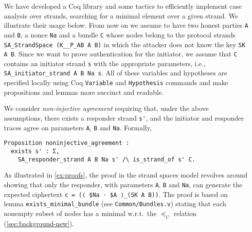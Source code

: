 We have developed a Coq library and some tactics to efficiently implement case analysis over strands, searching for a minimal element over a given strand.
We illustrate their usage below.
From now on we assume to have two honest parties \lstinline|A| and \lstinline|B|, a nonce \lstinline|Na| and a bundle \lstinline|C| whose nodes belong to the protocol strands \lstinline|SA_StrandSpace (K__P_AB A B)| in which the attacker does not know the key \lstinline|SK A B|. Since we want to prove authentication for the initiator, we assume that \lstinline|C| contains an initiator strand \lstinline|s| with the appropriate parameters, i.e., \lstinline|SA_initiator_strand A B Na s|.
All of these variables and hypotheses are specified locally using Coq \lstinline|Variable| and \lstinline|Hypothesis| commands and make propositions and lemmas more succinct and readable.

We consider \emph{non-injective agreement} requiring that, under the above assumptions,
there exists a responder strand \lstinline{s'}, and the initiator and responder traces agree on parameters
\lstinline{A}, \lstinline{B} and \lstinline{Na}.
Formally,
\begin{lstlisting}
Proposition noninjective_agreement :
  exists s' : Σ,
    SA_responder_strand A B Na s' /\ is_strand_of s' C.
\end{lstlisting}





\noindent
As illustrated in \cref{ex:proofs},
the proof in the strand spaces model revolves around showing that only the responder, with parameters \lstinline{A}, \lstinline{B} and \lstinline{Na}, can generate the expected ciphertext \lstinline{c = (⟨ $Na ⋅ $A ⟩_(SK A B))}.
The proof
is based on lemma \texttt{\small exists\_minimal\_bundle} (see \lstinline{Common/Bundles.v}) stating that each nonempty subset of nodes has a minimal w.r.t.\ the $\preceq_C$ relation (\cref{sec:background-new}).

